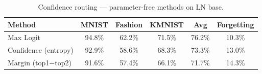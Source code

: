 \begin{table}[h]
\centering
\caption{Confidence routing --- parameter-free methods on LN base.}
\begin{tabular}{l c c c c c}
\hline
\textbf{Method} & \textbf{MNIST} & \textbf{Fashion} & \textbf{KMNIST} & \textbf{Avg} & \textbf{Forgetting} \\
\hline
Max Logit & 94.8\% & 62.2\% & 71.5\% & 76.2\% & 10.3\% \\
Confidence (entropy) & 92.9\% & 58.6\% & 68.3\% & 73.3\% & 13.0\% \\
Margin (top1$-$top2) & 91.6\% & 57.4\% & 66.1\% & 71.7\% & 14.3\% \\
\hline
\end{tabular}
\end{table}
